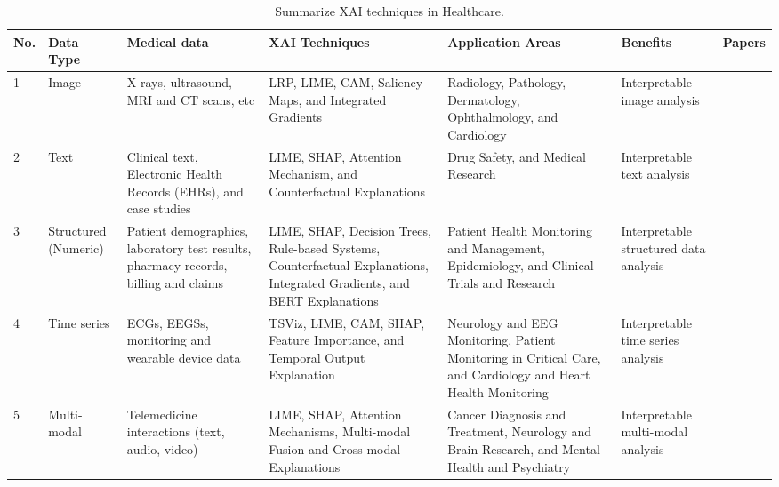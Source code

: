 \documentclass[final,5p,times,twocolumn]{elsarticle}
\begin{document}
\begin{table}[h]
  \begin{center}
    \caption{Summarize XAI techniques in Healthcare.}        \label{HealthcareSumXAItechniques}
    \begin{tabular}{m{10pt}|m{40pt}|m{70pt}|m{90pt}|m{105pt}|m{50pt}|m{55pt}} \hline
        \textbf{No.} & \textbf{Data Type}&\textbf{Medical data}&\textbf{XAI Techniques}& \textbf{Application Areas} & \textbf{Benefits} & \textbf{Papers} \\ \hline  
        1 & Image &X-rays, ultrasound, MRI and CT scans, etc&LRP, LIME, CAM, Saliency Maps, and Integrated Gradients &Radiology, Pathology, Dermatology, Ophthalmology, and Cardiology & Interpretable image analysis &\cite{li2019large, bian2019weakly, rajaraman2019visualizing, yang2015manifold} \\ \hline
        
        2& Text  & Clinical text, Electronic Health Records (EHRs), and case studies  & LIME, SHAP, Attention Mechanism, and Counterfactual Explanations &  Drug Safety, and Medical Research & Interpretable text analysis & \cite{ahmed2022eandc, ming2018rulematrix,  rane2023explainable}  \\ \hline
        
        3& Structured (Numeric)  & Patient demographics, laboratory test results, pharmacy records, billing and claims  & LIME, SHAP, Decision Trees, Rule-based Systems, Counterfactual Explanations, Integrated Gradients, and BERT Explanations & Patient Health Monitoring and Management, Epidemiology, and Clinical Trials and Research & Interpretable structured data analysis & \cite{guidotti2018survey, rane2023explainable,magunia2021machine} \\ \hline 
        
        4& Time series  & ECGs, EEGSs, monitoring and wearable device data & TSViz, LIME, CAM, SHAP, Feature Importance, and Temporal Output Explanation  & Neurology and EEG Monitoring, Patient Monitoring in Critical Care, and Cardiology and Heart Health Monitoring & Interpretable time series analysis & \cite{raza2022designing, morabito2023explainable} \\  \hline
        
        5& Multi-modal & Telemedicine interactions (text, audio, video) & LIME, SHAP, Attention Mechanisms, Multi-modal Fusion and Cross-modal Explanations & Cancer Diagnosis and Treatment, Neurology and Brain Research, and Mental Health and Psychiatry & Interpretable multi-modal analysis & \cite{el2021multilayer, yang2022unbox} \\ \hline 
        

\end{tabular}
\end{center}
\end{table}
\end{document}
